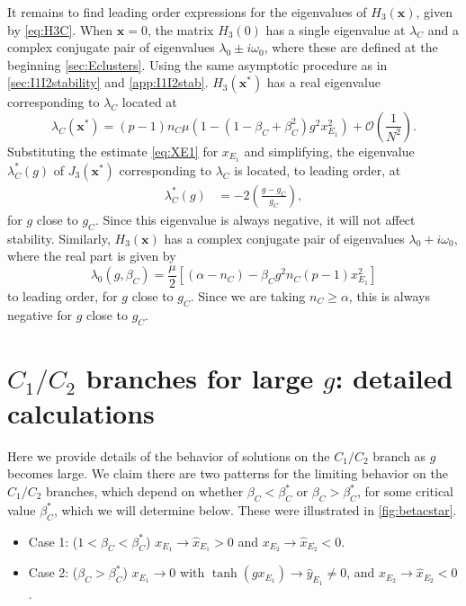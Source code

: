 \documentclass[reqno]{siamonline190516}
\newcommand{\xvec}{\mathbf{x}}
\begin{document}
It remains to find leading order expressions for the eigenvalues of $H_3(\xvec)$, given by \cref{eq:H3C}. When $\xvec = 0$, the matrix $H_3(0)$ has a single eigenvalue at $\lambda_C$ and a complex conjugate pair of eigenvalues $\lambda_0 \pm i \omega_0$, where these are defined at the beginning \cref{sec:Eclusters}. Using the same asymptotic procedure as in \cref{sec:I1I2stability} and \cref{app:I1I2stab}. $H_3(\xvec^*)$ has a real eigenvalue corresponding to $\lambda_C$ located at
\[
\lambda_C(\xvec^*) = (p-1)n_C \mu  \left(1 - (1 - \beta_C+\beta_C^2)g^2 x_{E_1}^2 \right) + \mathcal{O}\left(\frac{1}{N^2} \right).
\]
Substituting the estimate \cref{eq:XE1} for $x_{E_1}$ and simplifying, the eigenvalue $\lambda_C^*(g)$ of $J_3(\xvec^*)$ corresponding to $\lambda_C$ is located, to leading order, at 
\begin{align*}
    \lambda_C^*(g) &= -2\left( \frac{g - g_C}{g_C} \right),
\end{align*}
for $g$ close to $g_C$. Since this eigenvalue is always negative, it will not affect stability. Similarly, $H_3(\xvec)$ has a complex conjugate pair of eigenvalues $\lambda_0 + i \omega_0$, where the real part is given by
\begin{equation*}
\lambda_0(g, \beta_C) = \frac{\mu}{2}\left[ (\alpha - n_C) - \beta_C g^2 n_C (p - 1) x_{E_1}^2 \right]
\end{equation*}
to leading order, for $g$ close to $g_C$. Since we are taking $n_C \geq \alpha$, this is always negative for $g$ close to $g_C$. 

\section{\texorpdfstring{$C_1/C_2$}{C1/C2} branches for large \texorpdfstring{$g$}{g}: detailed calculations}\label{app:C1C2_largeg} 
Here we provide details of the behavior of solutions on the $C_1/C_2$ branch as $g$ becomes large.  We claim there are two patterns for the limiting behavior on the $C_1/C_2$ branches, which depend on whether $\beta_C < \beta_C^*$ or $\beta_C > \beta_C^*$, for some critical value $\beta_C^*$, which we will determine below. These were illustrated in \cref{fig:betacstar}.\\
\begin{itemize}
    \item Case 1: ($1 < \beta_C < \beta_C^*$) $x_{E_1} \rightarrow \hat{x}_{E_1} > 0$ and $x_{E_2} \rightarrow \hat{x}_{E_2} < 0$. 
    \item Case 2: ($\beta_C > \beta_C^*$) $x_{E_1} \rightarrow 0$ with $\tanh(g x_{E_1}) \rightarrow \hat{y}_{E_1} \neq 0$, and $x_{E_2} \rightarrow \hat{x}_{E_2} < 0$.
\end{itemize}
\end{document}
